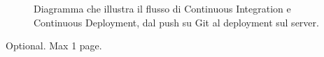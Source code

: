 \documentclass[12pt,a4paper,openright,twoside]{book}
\begin{document}
\begin{figure}[h!]
    \centering
    \caption{Diagramma che illustra il flusso di Continuous Integration e Continuous Deployment, dal push su Git al deployment sul server.}
    \label{fig:ci_cd_diagram}
\end{figure}


\backmatter

\nocite{*} %




\begin{acknowledgements} %
    Optional. Max 1 page.
\end{acknowledgements}
\end{document}

